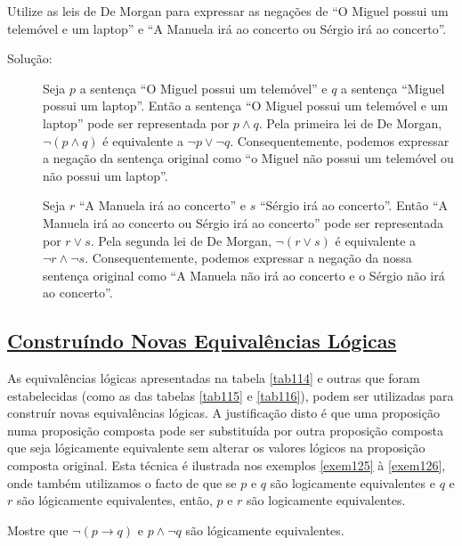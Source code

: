 \begin{exmp}
\label{exem124}
Utilize as leis de De Morgan para expressar as negações de ``O Miguel possui um
telemóvel e um laptop'' e ``A Manuela irá ao concerto ou Sérgio irá ao
concerto''.
\end{exmp}

\begin{description}
\item[Solução: ]Seja $p$ a sentença ``O Miguel possui um telemóvel'' e $q$ a
sentença ``Miguel possui um laptop''. Então a sentença ``O Miguel possui um
telemóvel e um laptop'' pode ser representada por $p \land q$. Pela primeira lei
de De Morgan, $\lnot (p \land q)$ é equivalente a $\lnot p \lor \lnot q$.
Consequentemente, podemos expressar a negação da sentença original como ``o
Miguel não possui um telemóvel ou não possui um laptop''.
\item[]Seja $r$ ``A Manuela irá ao concerto'' e $s$ ``Sérgio irá ao  concerto''.
Então ``A Manuela irá ao concerto ou Sérgio irá ao concerto'' pode ser
representada por $r \lor s$. Pela segunda lei de De Morgan, $\lnot (r \lor s)$ é
equivalente a $\lnot r \land \lnot s$. Consequentemente, podemos expressar a
negação da nossa sentença original como ``A Manuela não irá ao concerto e o
Sérgio não irá ao concerto''.
\end{description}


\subsection*{\underline{Construíndo Novas Equivalências Lógicas}}

As equivalências lógicas apresentadas na tabela \ref{tab114} e outras que
foram estabelecidas (como as das tabelas \ref{tab115} e \ref{tab116}),
podem ser utilizadas para construír novas equivalências lógicas. A justificação
disto é que uma proposição numa proposição composta pode ser substituída por
outra proposição composta que seja lógicamente equivalente sem alterar os
valores lógicos na proposição composta original. Esta técnica é ilustrada nos
exemplos \ref{exem125} à \ref{exem126}, onde também utilizamos o facto de que se
$p$ e $q$ são logicamente equivalentes e $q$ e $r$ são lógicamente equivalentes,
então, $p$ e $r$ são logicamente equivalentes.

\begin{exmp}
\label{exem125}
Mostre que $\lnot (p \to q)$ e $p \land \lnot q$ são lógicamente equivalentes.
\end{exmp}

